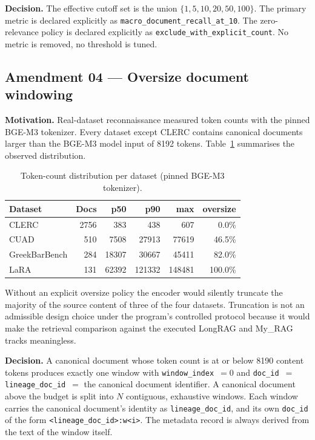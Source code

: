 \documentclass[11pt,a4paper]{article}
\begin{document}
\textbf{Decision.} The effective cutoff set is the union
$\{1, 5, 10, 20, 50, 100\}$. The primary metric is declared
explicitly as \texttt{macro\_document\_recall\_at\_10}. The
zero-relevance policy is declared explicitly as
\texttt{exclude\_with\_explicit\_count}. No metric is removed, no
threshold is tuned.

\subsection{Amendment 04 --- Oversize document windowing}
\textbf{Motivation.} Real-dataset reconnaissance measured token
counts with the pinned BGE-M3 tokenizer. Every dataset except CLERC
contains canonical documents larger than the BGE-M3 model input of
\num{8192} tokens. Table~\ref{tab:oversize} summarises the observed
distribution.

\begin{table}[h]
\centering
\caption{Token-count distribution per dataset (pinned BGE-M3
tokenizer).}
\label{tab:oversize}
\small
\begin{tabular}{l r r r r r}
\toprule
\textbf{Dataset} & \textbf{Docs} & \textbf{p50} & \textbf{p90}
  & \textbf{max} & \textbf{oversize} \\
\midrule
CLERC              & \num{2756} & \num{383}   & \num{438}
                   & \num{607}   & \num{0.0}\% \\
CUAD               & \num{510}  & \num{7508}  & \num{27913}
                   & \num{77619} & \num{46.5}\% \\
GreekBarBench      & \num{284}  & \num{18307} & \num{30667}
                   & \num{45411} & \num{82.0}\% \\
LaRA               & \num{131}  & \num{62392} & \num{121332}
                   & \num{148481} & \num{100.0}\% \\
\bottomrule
\end{tabular}
\end{table}

Without an explicit oversize policy the encoder would silently
truncate the majority of the source content of three of the four
datasets. Truncation is not an admissible design choice under the
program's controlled protocol because it would make the retrieval
comparison against the executed LongRAG and My\_RAG tracks
meaningless.

\textbf{Decision.} A canonical document whose token count is at or
below \num{8190} content tokens produces exactly one window with
\texttt{window\_index}~$=0$ and \texttt{doc\_id}~$=$
\texttt{lineage\_doc\_id}~$=$ the canonical document identifier. A
canonical document above the budget is split into $N$ contiguous,
exhaustive windows. Each window carries the canonical document's
identity as \texttt{lineage\_doc\_id}, and its own
\texttt{doc\_id} of the form
\texttt{<lineage\_doc\_id>:w<i>}. The metadata record is always
derived from the text of the window itself.
\end{document}
